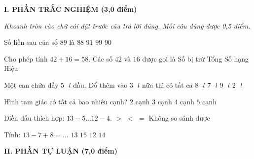 
\setcounter{ex}{0}
\setcounter{bt}{0}

\textbf{\large I. PHẦN TRẮC NGHIỆM (3,0 điểm)}

{\itshape Khoanh tròn vào chữ cái đặt trước câu trả lời đúng. Mỗi câu đúng được 0,5 điểm.}

\begin{ex} %
Số liền sau của số $89$ là
\choice
{$88$}
{$91$}
{$99$}
{\True $90$}
\end{ex}

\begin{ex} %
Cho phép tính $42 + 16 = 58$. Các số $42$ và $16$ được gọi là
\choice
{Số bị trừ}
{Tổng}
{\True Số hạng}
{Hiệu}
\end{ex}

\begin{ex} %
Một can chứa đầy $5\text{ }l$ dầu. Đổ thêm vào $3\text{ }l$ nữa thì có tất cả
\choice
{\True $8\text{ }l$}
{$7\text{ }l$}
{$9\text{ }l$}
{$2\text{ }l$}
\end{ex}

\begin{ex} %
Hình tam giác có tất cả bao nhiêu cạnh?
\choice
{$2$ cạnh}
{\True $3$ cạnh}
{$4$ cạnh}
{$5$ cạnh}
\end{ex}

\begin{ex} %
Điền dấu thích hợp: $13 - 5 \dots 12 - 4$.
\choice
{$>$}
{$<$}
{\True $=$}
{Không so sánh được}
\end{ex}

\begin{ex} %
Tính: $13 - 7 + 8 = \dots$
\choice
{$13$}
{$15$}
{$12$}
{\True $14$}
\end{ex}

\vspace{4mm}
\textbf{\large II. PHẦN TỰ LUẬN (7,0 điểm)}

